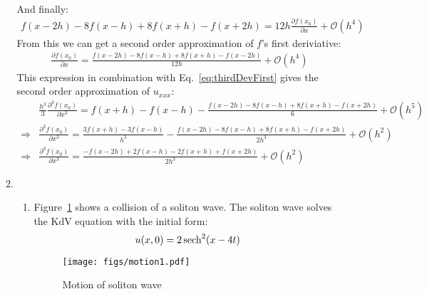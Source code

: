 \documentclass[12pt,a4]{article}
\begin{document}
\begin{enumerate}
\begin{enumerate}
\begin{align*}
        \end{align*}
        And finally:
        \begin{align*}
          f(x - 2 h)- 8 f(x - h) + 8 f(x + h) - f(x + 2 h) =  12 h \frac{\partial f(x_0)}{\partial x} + \mathscr{O}(h^4) %
        \end{align*}
        From this we can get a second order approximation of $f$'s first deriviative:
        \begin{align*}
          \frac{\partial f(x_0)}{\partial x} = \frac{f(x - 2 h)- 8 f(x - h) + 8 f(x + h) - f(x - 2 h)}{12 h} + \mathscr{O}(h^4) %
        \end{align*}
        This expression in combination with Eq.~\ref{eq:thirdDevFirst} gives the second order approximation of $u_{xxx}$:
        \begin{align*}
                      & \frac{h^3}{3} \frac{\partial^3 f(x_0)}{\partial x^3} = f(x + h) - f(x - h) - \frac{f(x - 2 h)- 8 f(x - h) + 8 f(x + h) - f(x + 2 h)}{6} + \mathscr{O}(h^5)\\ %
          \Rightarrow & \frac{\partial^3 f(x_0)}{\partial x^3} = \frac{3 f(x + h) - 3 f(x - h)}{h^3} - \frac{f(x - 2 h)- 8 f(x - h) + 8 f(x + h) - f(x + 2 h)}{2 h^3} + \mathscr{O}(h^2)\\ %
          \Rightarrow & \frac{\partial^3 f(x_0)}{\partial x^3} = \frac{- f(x - 2 h) + 2 f(x - h) - 2 f(x + h) + f(x +  2 h)}{2 h^3} + \mathscr{O}(h^2) %
        \end{align*}
      \item
        \begin{enumerate}
          \item
            Figure~\ref{fig:motion1} shows a collision of a soliton wave.
            The soliton wave solves the KdV equation with the initial form:
            \begin{equation*}
              u(x, 0) = 2 \sech ^ 2 (x - 4t)
            \end{equation*}
            \begin{figure}[H]
              \centering
              \texttt{[image: figs/motion1.pdf]}
              \caption{Motion of soliton wave}
              \label{fig:motion1}

\end{figure}
\end{enumerate}
\end{enumerate}
\end{enumerate}
\end{document}
